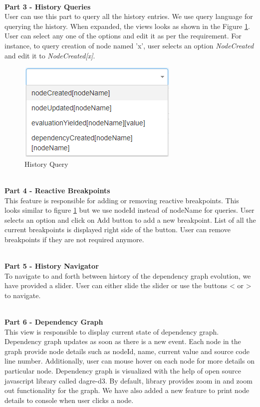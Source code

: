 \leavevmode
\\
\textbf{Part 3 - History Queries}
\\
User can use this part to query all the history entries. We use query language for querying the history. When expanded, the views looks as shown in the Figure \ref{fig:language-query}. User can select any one of the options and edit it as per the requirement. For instance, to query creation of node named 'x', user selects an option \textit{NodeCreated} and edit it to \textit{NodeCreated[x]}.
\begin{figure}[!h]
	\centering
	\includegraphics[scale=1,trim=0 0 0 0]{images/language-query.png}
	\caption{History Query}
	\label{fig:language-query}
\end{figure}

\leavevmode
\\
\textbf{Part 4 - Reactive Breakpoints}
\\
This feature is responsible for adding or removing reactive breakpoints. This looks similar to figure \ref{fig:language-query} but we use nodeId instead of nodeName for queries. User selects an option and click on Add button to add a new breakpoint. List of all the current breakpoints is displayed right side of the button. User can remove breakpoints if they are not required anymore.

\leavevmode
\\
\textbf{Part 5 - History Navigator}
\\
To navigate to and forth between history of the dependency graph evolution, we have provided a slider. User can either slide the slider or use the buttons < or > to navigate. 

\leavevmode
\\
\textbf{Part 6 - Dependency Graph}
\\
This view is responsible to display current state of dependency graph. Dependency graph updates as soon as there is a new event. Each node in the graph provide node details such as nodeId, name, current value and source code line number. Additionally, user can mouse hover on each node for more details on particular node. Dependency graph is visualized with the help of open source javascript library called dagre-d3\cite{dagred3}. By default, library provides zoom in and zoom out functionality for the graph. We have also added a new feature to print node details to console when user clicks a node. 